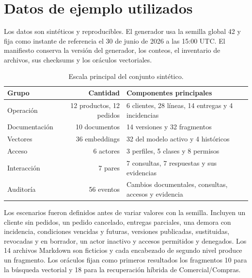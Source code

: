 \section{Datos de ejemplo utilizados}

Los datos son sintéticos y reproducibles. El generador usa la semilla global
42 y fija como instante de referencia el 30 de junio de 2026 a las 15:00 UTC.
El manifiesto conserva la versión del generador, los conteos, el inventario de
archivos, sus checksums y los oráculos vectoriales.

\begin{table}[ht]
\centering
\small
\begin{tabular}{l r l}
\toprule
Grupo & Cantidad & Componentes principales \\
\midrule
Operación & 12 productos, 12 pedidos & 6 clientes, 28 líneas, 14 entregas y 4 incidencias \\
Documentación & 10 documentos & 14 versiones y 32 fragmentos \\
Vectores & 36 embeddings & 32 del modelo activo y 4 históricos \\
Acceso & 6 actores & 3 perfiles, 5 clases y 8 permisos \\
Interacción & 7 pares & 7 consultas, 7 respuestas y sus evidencias \\
Auditoría & 56 eventos & Cambios documentales, consultas, accesos y evidencia \\
\bottomrule
\end{tabular}
\caption{Escala principal del conjunto sintético.}
\end{table}

Los escenarios fueron definidos antes de variar valores con la semilla.
Incluyen un cliente sin pedidos, un pedido cancelado, entregas parciales, una
demora con incidencia, condiciones vencidas y futuras, versiones publicadas,
sustituidas, revocadas y en borrador, un actor inactivo y accesos permitidos y
denegados. Los 14 archivos Markdown son ficticios y cada encabezado de segundo
nivel produce un fragmento. Los oráculos fijan como primeros resultados los
fragmentos 10 para la búsqueda vectorial y 18 para la recuperación híbrida de
Comercial/Compras.
